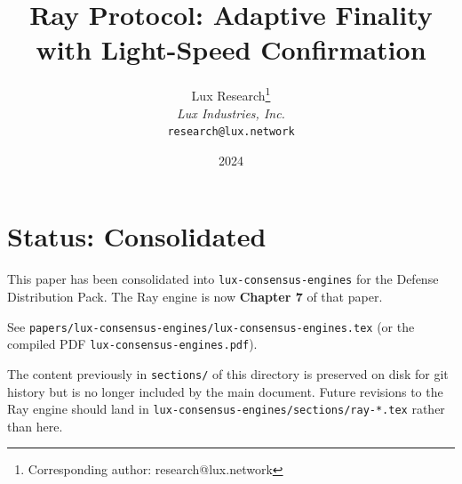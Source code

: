 \documentclass[11pt,a4paper]{article}
\title{\textbf{Ray Protocol: Adaptive Finality\\with Light-Speed Confirmation}}
\author{
Lux Research\thanks{Corresponding author: research@lux.network}\\
\textit{Lux Industries, Inc.}\\
\texttt{research@lux.network}
}
\date{2024}
\begin{document}
\luxcoverpage

\section*{Status: Consolidated}

This paper has been consolidated into \texttt{lux-consensus-engines} for the
Defense Distribution Pack. The Ray engine is now \textbf{Chapter 7} of that paper.

See \texttt{papers/lux-consensus-engines/lux-consensus-engines.tex} (or the
compiled PDF \texttt{lux-consensus-engines.pdf}).

The content previously in \texttt{sections/} of this directory is preserved on
disk for git history but is no longer included by the main document. Future
revisions to the Ray engine should land in
\texttt{lux-consensus-engines/sections/ray-*.tex} rather than here.
\end{document}
